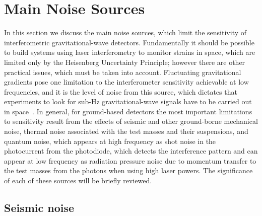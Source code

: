 \section{Main Noise Sources}
\label{section:noise} 

In this section we discuss the main noise sources, which limit the sensitivity of
interferometric gravitational-wave detectors. Fundamentally it should be
possible to build systems using laser interferometry to monitor strains in space,
which are limited only by the Heisenberg Uncertainty Principle; however there
are other practical issues, which must be taken into account. Fluctuating
gravitational gradients pose one limitation to the interferometer sensitivity
achievable at low frequencies, and it is the level of noise from this source,
which dictates that experiments to look for sub-Hz gravitational-wave signals
have to be carried out in space~\cite{Spero, Saulson1, Beccaria, Thorne:1998}.
In general, for ground-based detectors the most important limitations to
sensitivity result from the effects of seismic and other ground-borne mechanical
noise, thermal noise associated with the test masses and their suspensions, and
quantum noise, which appears at high frequency as shot noise in the photocurrent
from the photodiode, which detects the interference pattern and can appear at low
frequency as radiation pressure noise due to momentum transfer to the test
masses from the photons when using high laser powers. The significance of each
of these sources will be briefly reviewed.


\subsection{Seismic noise}
\label{subsection:seismic} 

